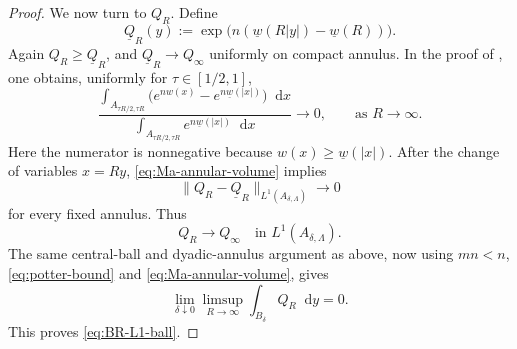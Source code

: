 \documentclass[12pt]{amsart}
\theoremstyle{plain}
\theoremstyle{definition}
\theoremstyle{remark}     %
\numberwithin{equation}{section}
\newcommand{\dd}{\mathop{}\!\mathrm{d}}%
\begin{document}
\begin{proof}

We now turn to $Q_R$.  Define
\[
    \underline Q_R(y)
    :=\exp\bigl(n(\underline w(R|y|)-\underline w(R))\bigr).
\]
Again $Q_R\geq\underline Q_R$, and $\underline Q_R\to Q_\infty$
uniformly on compact annulus. In the proof of \cite[Page 25]{M}, one obtains, uniformly for
$\tau\in[1/2,1]$,
\begin{equation}\label{eq:Ma-annular-volume}
\frac{
\displaystyle
\int_{A_{\tau R/2,\tau R}}
\bigl(e^{nw(x)}-e^{n\underline w(|x|)}\bigr)\dd x
}{
\displaystyle
\int_{A_{\tau R/2,\tau R}}
 e^{n\underline w(|x|)}\dd x
}
\to 0, \qquad \text{as $R\to\infty $}.
\end{equation}
Here the numerator is nonnegative because
$w(x)\geq\underline w(|x|)$.  After the change of variables $x=Ry$,
\cref{eq:Ma-annular-volume} implies
\[
    \|Q_R-\underline Q_R\|_{L^1(A_{\delta,\Lambda})}
    \to0
\]
for every fixed annulus. Thus
\[
    Q_R\to Q_\infty
    \quad\text{in }L^1(A_{\delta,\Lambda}).
\]
The same central-ball and dyadic-annulus argument as above, now using
$mn<n$, \cref{eq:potter-bound} and \cref{eq:Ma-annular-volume}, gives
\[
    \lim_{\delta\downarrow0}
    \limsup_{R\to\infty}
    \int_{B_\delta}Q_R\dd y=0.
\]
This proves \cref{eq:BR-L1-ball}.


\end{proof}
\end{document}
